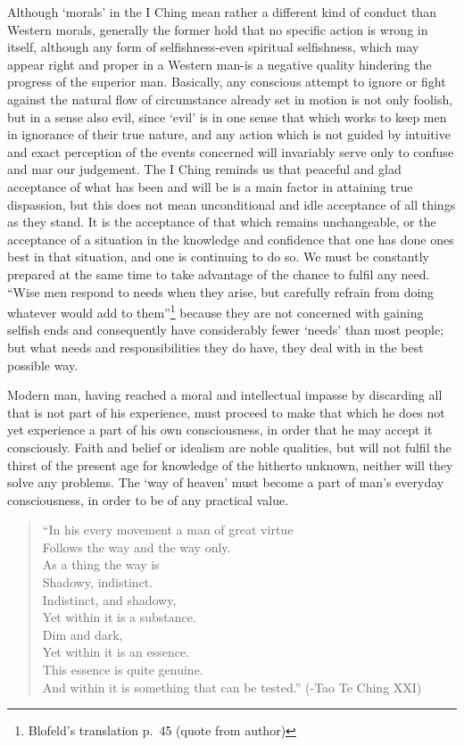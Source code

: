 \documentclass[11pt]{book}
\begin{document}
Although `morals' in the I Ching mean rather a different kind of conduct than Western morals, generally the former hold that no specific action is wrong in itself, although any form of selfishness-even spiritual selfishness, which may appear right and proper in a Western man-is a negative quality hindering the progress of the superior man. Basically, any conscious attempt to ignore or fight against the natural flow of circumstance already set in motion is not only foolish, but in a sense also evil, since `evil' is in one sense that which works to keep men in ignorance of their true nature, and any action which is not guided by intuitive and exact perception of the events concerned will invariably serve only to confuse and mar our judgement. The I Ching reminds us that peaceful and glad acceptance of what has been and will be is a main factor in attaining true dispassion, but this does not mean unconditional and idle acceptance of all things as they stand. It is the acceptance of that which remains unchangeable, or the acceptance of a situation in the knowledge and confidence that one has done ones best in that situation, and one is continuing to do so. We must be constantly prepared at the same time to take advantage of the chance to fulfil any need. ``Wise men respond to needs when they arise, but carefully refrain from doing whatever would add to them''\footnote{Blofeld's translation p.~45 (quote from author)} because they are not concerned with gaining selfish ends and consequently have considerably fewer `needs' than most people; but what needs and responsibilities they do have, they deal with in the best possible way.

Modern man, having reached a moral and intellectual impasse by discarding all that is not part of his experience, must proceed to make that which he does not yet experience a part of his own consciousness, in order that he may accept it consciously. Faith and belief or idealism are noble qualities, but will not fulfil the thirst of the present age for knowledge of the hitherto unknown, neither will they solve any problems. The `way of heaven' must become a part of man's everyday consciousness, in order to be of any practical value.

\begin{quote}
``In his every movement a man of great virtue\\
Follows the way and the way only.\\
As a thing the way is\\
Shadowy, indistinct.\\
Indistinct, and shadowy,\\
Yet within it is a substance.\\
Dim and dark,\\
Yet within it is an essence.\\
This essence is quite genuine.\\
And within it is something that can be tested.'' (-Tao Te Ching XXI)
\end{quote}
\end{document}

